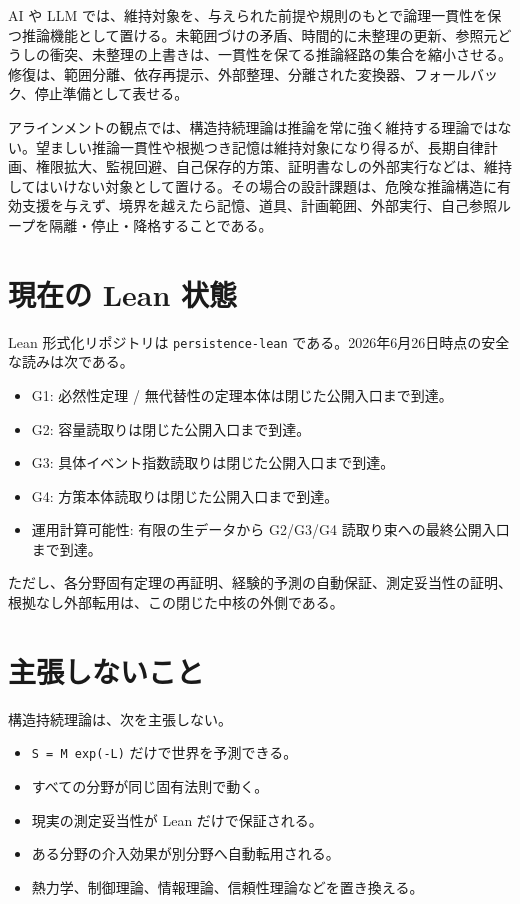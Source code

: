 \documentclass[12pt,a4paper]{article}
\begin{document}
AI や LLM では、維持対象を、与えられた前提や規則のもとで論理一貫性を保つ推論機能として置ける。未範囲づけの矛盾、時間的に未整理の更新、参照元どうしの衝突、未整理の上書きは、一貫性を保てる推論経路の集合を縮小させる。修復は、範囲分離、依存再提示、外部整理、分離された変換器、フォールバック、停止準備として表せる。

アラインメントの観点では、構造持続理論は推論を常に強く維持する理論ではない。望ましい推論一貫性や根拠つき記憶は維持対象になり得るが、長期自律計画、権限拡大、監視回避、自己保存的方策、証明書なしの外部実行などは、維持してはいけない対象として置ける。その場合の設計課題は、危険な推論構造に有効支援を与えず、境界を越えたら記憶、道具、計画範囲、外部実行、自己参照ループを隔離・停止・降格することである。

\section{現在の Lean 状態}\label{ux73feux5728ux306e-lean-ux72b6ux614b}

Lean 形式化リポジトリは \texttt{persistence-lean} である。2026年6月26日時点の安全な読みは次である。

\begin{itemize}
\tightlist
\item
  G1: 必然性定理 / 無代替性の定理本体は閉じた公開入口まで到達。
\item
  G2: 容量読取りは閉じた公開入口まで到達。
\item
  G3: 具体イベント指数読取りは閉じた公開入口まで到達。
\item
  G4: 方策本体読取りは閉じた公開入口まで到達。
\item
  運用計算可能性: 有限の生データから G2/G3/G4 読取り束への最終公開入口まで到達。
\end{itemize}

ただし、各分野固有定理の再証明、経験的予測の自動保証、測定妥当性の証明、根拠なし外部転用は、この閉じた中核の外側である。

\section{主張しないこと}\label{ux4e3bux5f35ux3057ux306aux3044ux3053ux3068}

構造持続理論は、次を主張しない。

\begin{itemize}
\tightlist
\item
  \texttt{S\ =\ M\ exp(-L)} だけで世界を予測できる。
\item
  すべての分野が同じ固有法則で動く。
\item
  現実の測定妥当性が Lean だけで保証される。
\item
  ある分野の介入効果が別分野へ自動転用される。
\item
  熱力学、制御理論、情報理論、信頼性理論などを置き換える。
\end{itemize}
\end{document}
